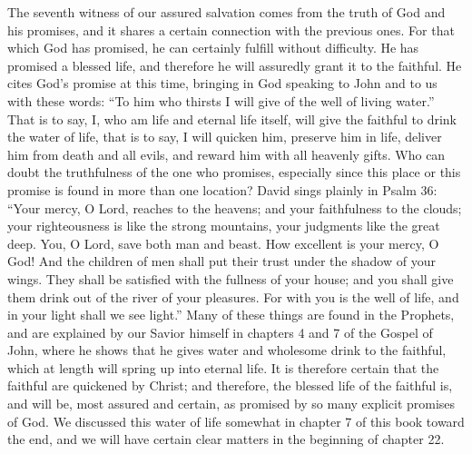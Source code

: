 The seventh witness of our assured salvation comes from the truth of God and his promises, and it shares a certain connection with the previous ones. For that which God has promised, he can certainly fulfill without difficulty. He has promised a blessed life, and therefore he will assuredly grant it to the faithful. He cites God’s promise at this time, bringing in God speaking to John and to us with these words: “To him who thirsts I will give of the well of living water.” That is to say, I, who am life and eternal life itself, will give the faithful to drink the water of life, that is to say, I will quicken him, preserve him in life, deliver him from death and all evils, and reward him with all heavenly gifts. Who can doubt the truthfulness of the one who promises, especially since this place or this promise is found in more than one location? David sings plainly in Psalm 36: “Your mercy, O Lord, reaches to the heavens; and your faithfulness to the clouds; your righteousness is like the strong mountains, your judgments like the great deep. You, O Lord, save both man and beast. How excellent is your mercy, O God! And the children of men shall put their trust under the shadow of your wings. They shall be satisfied with the fullness of your house; and you shall give them drink out of the river of your pleasures. For with you is the well of life, and in your light shall we see light.” Many of these things are found in the Prophets, and are explained by our Savior himself in chapters 4 and 7 of the Gospel of John, where he shows that he gives water and wholesome drink to the faithful, which at length will spring up into eternal life. It is therefore certain that the faithful are quickened by Christ; and therefore, the blessed life of the faithful is, and will be, most assured and certain, as promised by so many explicit promises of God. We discussed this water of life somewhat in chapter 7 of this book toward the end, and we will have certain clear matters in the beginning of chapter 22.

